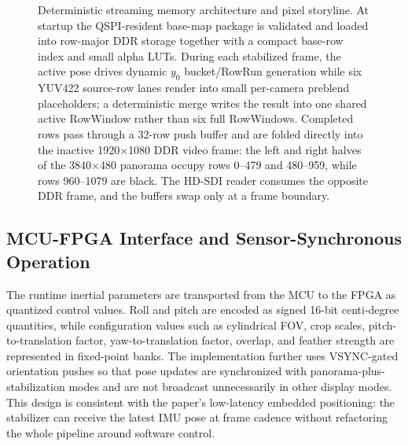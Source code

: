 \documentclass[journal]{IEEEtran}
\begin{document}
\begin{figure}[t]
{}
\caption{Deterministic streaming memory architecture and pixel storyline. At startup the QSPI-resident base-map package is validated and loaded into row-major DDR storage together with a compact base-row index and small alpha LUTs. During each stabilized frame, the active pose drives dynamic $y_0$ bucket/RowRun generation while six YUV422 source-row lanes render into small per-camera preblend placeholders; a deterministic merge writes the result into one shared active RowWindow rather than six full RowWindows. Completed rows pass through a 32-row push buffer and are folded directly into the inactive 1920$\times$1080 DDR video frame: the left and right halves of the 3840$\times$480 panorama occupy rows 0--479 and 480--959, while rows 960--1079 are black. The HD-SDI reader consumes the opposite DDR frame, and the buffers swap only at a frame boundary.}
\label{fig:memory}
\end{figure}

\subsection{MCU-FPGA Interface and Sensor-Synchronous Operation}
The runtime inertial parameters are transported from the MCU to the FPGA as quantized control values. Roll and pitch are encoded as signed 16-bit centi-degree quantities, while configuration values such as cylindrical FOV, crop scales, pitch-to-translation factor, yaw-to-translation factor, overlap, and feather strength are represented in fixed-point banks. The implementation further uses VSYNC-gated orientation pushes so that pose updates are synchronized with panorama-plus-stabilization modes and are not broadcast unnecessarily in other display modes. This design is consistent with the paper's low-latency embedded positioning: the stabilizer can receive the latest IMU pose at frame cadence without refactoring the whole pipeline around software control.
\end{document}
